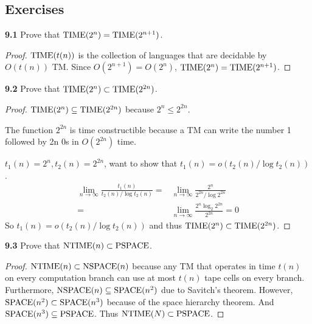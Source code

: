 \subsection{Exercises}

\textbf{9.1} Prove that $\text{TIME}(2^n) = \text{TIME}(2^{n+1})$.
\begin{mdframed}
\begin{proof}
$\text{TIME}(t(n))$ is the collection of languages that are decidable by $O(t(n))$ TM. Since $O(2^{n+1}) = O(2^n)$, $\text{TIME}(2^n) = \text{TIME}(2^{n+1})$.
\end{proof}
\end{mdframed}

\textbf{9.2} Prove that $\text{TIME}(2^n) \subset \text{TIME}(2^{2n})$.
\begin{mdframed}
\begin{proof}
$\text{TIME}(2^n) \subseteq \text{TIME}(2^{2n})$ because $2^n \leq 2^{2n}$.

The function $2^{2n}$ is time constructible because a TM can write the number 1 followed by 2n 0s in $O(2^{2n})$ time.

$t_1(n) = 2^n, t_2(n) = 2^{2n}$, want to show that $t_1(n) = o(t_2(n) / \log t_2(n))$.
\begin{align*}
\lim_{n\rightarrow \infty} \frac{t_1(n)}{t_2(n) / \log t_2(n)} = &
\lim_{n\rightarrow \infty} \frac{2^n}{2^{2n} / \log 2^{2n}} \\
= & \lim_{n\rightarrow \infty} \frac{2^n \log_2 2^{2n}}{2^{2n}} = 0
\end{align*}
So $t_1(n) = o(t_2(n) / \log t_2(n))$ and thus $\text{TIME}(2^n) \subset \text{TIME}(2^{2n})$.
\end{proof}
\end{mdframed}

\textbf{9.3} Prove that $\text{NTIME}(n) \subset \text{PSPACE}$.
\begin{mdframed}
\begin{proof}
$\text{NTIME}(n) \subset \text{NSPACE}(n)$ because any TM that operates in time $t(n)$ on every computation branch can use at most $t(n)$ tape cells on every branch. Furthermore, $\text{NSPACE}(n) \subseteq \text{SPACE}(n^2)$ due to Savitch's theorem. However, $\text{SPACE}(n^2) \subset \text{SPACE}(n^3)$ because of the space hierarchy theorem. And $\text{SPACE}(n^3) \subseteq \text{PSPACE}$. Thus $\text{NTIME}(N) \subset \text{PSPACE}$.
\end{proof}
\end{mdframed}

